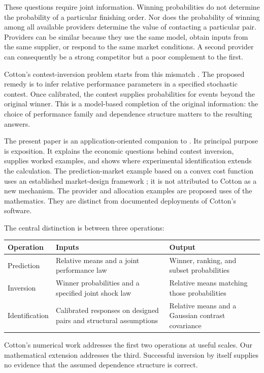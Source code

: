 \documentclass[11pt]{amsart}
\theoremstyle{definition}
\begin{document}
These questions require joint information. Winning probabilities do not determine the probability of a particular finishing order. Nor does the probability of winning among all available providers determine the value of contacting a particular pair. Providers can be similar because they use the same model, obtain inputs from the same supplier, or respond to the same market conditions. A second provider can consequently be a strong competitor but a poor complement to the first.

Cotton's contest-inversion problem starts from this mismatch \cite{cotton2021,cotton2026}. The proposed remedy is to infer relative performance parameters in a specified stochastic contest. Once calibrated, the contest supplies probabilities for events beyond the original winner. This is a model-based completion of the original information: the choice of performance family and dependence structure matters to the resulting answers.

The present paper is an application-oriented companion to \cite{wuebben2026}. Its principal purpose is exposition. It explains the economic questions behind contest inversion, supplies worked examples, and shows where experimental identification extends the calculation. The prediction-market example based on a convex cost function uses an established market-design framework \cite{abernethy2013}; it is not attributed to Cotton as a new mechanism. The provider and allocation examples are proposed uses of the mathematics. They are distinct from documented deployments of Cotton's software.

The central distinction is between three operations:
\begin{center}
\begin{tabular}{>{\raggedright\arraybackslash}p{}>{\raggedright\arraybackslash}p{}>{\raggedright\arraybackslash}p{}}
\toprule
Operation & Inputs & Output \\
\midrule
Prediction & Relative means and a joint performance law & Winner, ranking, and subset probabilities \\
Inversion & Winner probabilities and a specified joint shock law & Relative means matching those probabilities \\
Identification & Calibrated responses on designed pairs and structural assumptions & Relative means and a Gaussian contrast covariance \\
\bottomrule
\end{tabular}
\end{center}
Cotton's numerical work addresses the first two operations at useful scales. Our mathematical extension addresses the third. Successful inversion by itself supplies no evidence that the assumed dependence structure is correct.
\end{document}
